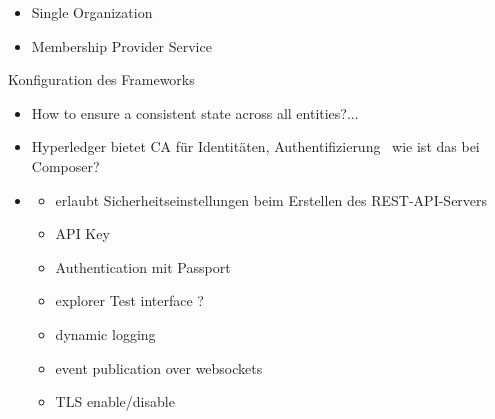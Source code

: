         \begin{itemize}[noitemsep]
            \item Single Organization 
            \item Membership Provider Service
        \end{itemize}
        
        Konfiguration des Frameworks
        \begin{itemize}[noitemsep]
            \item How to ensure a consistent state across all entities?...
            \item Hyperledger bietet CA für Identitäten, Authentifizierung \textrightarrow\ wie ist das bei Composer?
            \item \begin{itemize}
                \item erlaubt Sicherheitseinstellungen beim Erstellen des REST-API-Servers
                \item API Key
                \item Authentication mit Passport
                \item explorer Test interface ?
                \item dynamic logging
                \item event publication over websockets
                \item TLS enable/\-disable
            \end{itemize}
        \end{itemize}
    
